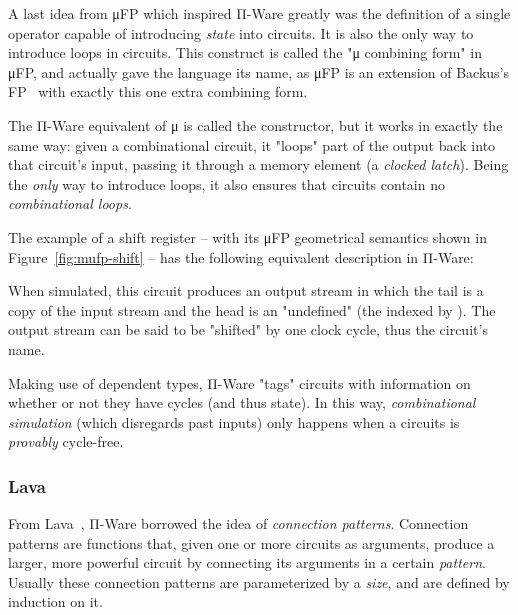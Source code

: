         A last idea from μFP which inspired Π-Ware greatly was the definition of a
        single operator capable of introducing \emph{state} into circuits.
        It is also the only way to introduce loops in circuits.
        This construct is called the "μ combining form" in μFP, and actually gave the language its name,
        as μFP is an extension of Backus's FP~\cite{backus-turing-lecture} with exactly this one
        extra combining form.

        The Π-Ware equivalent of μ is called the  constructor, but it works in exactly the same way:
        given a combinational circuit, it "loops" part of the output back into that circuit's input,
        passing it through a memory element (a \emph{clocked latch}).
        Being the \emph{only} way to introduce loops, it also ensures that circuits contain no
        \emph{combinational loops}.

        The example of a shift register – with its μFP geometrical semantics shown in
        Figure~\ref{fig:mufp-shift} – has the following equivalent description in Π-Ware:

        \begin{center}
        \end{center}

        When simulated, this circuit produces an output stream in which the tail is a copy of the
        input stream and the head is an "undefined"  (the  indexed by ).
        The output stream can be said to be "shifted" by one clock cycle, thus the circuit's name.

        Making use of dependent types, Π-Ware "tags" circuits with information on whether or not
        they have cycles (and thus state).
        In this way, \emph{combinational simulation} (which disregards past inputs) only happens
        when a circuits is \emph{provably} cycle-free.

        \subsubsection{Lava}
        From Lava~\cite{observable-sharing-circuits}, Π-Ware borrowed the idea of \emph{connection patterns}.
        Connection patterns are functions that, given one or more circuits as arguments,
        produce a larger, more powerful circuit by connecting its arguments in a certain \emph{pattern}.
        Usually these connection patterns are parameterized by a \emph{size},
        and are defined by induction on it.

